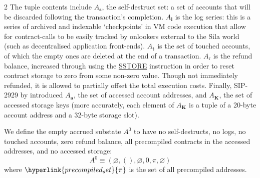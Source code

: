 \documentclass[9pt,oneside]{amsart}
\begin{document}
\begin{multicols}{2}
\hypertarget{self_destruct_set_wordy_defn_A__s}{}The tuple contents include $A_{\mathbf{s}}$, the self-destruct set: a set of accounts that will be discarded following the transaction's completion.
\hypertarget{tx_log_series_wordy_defn_A__l}{} $A_{\mathbf{l}}$ is the log series: this is a series of archived and indexable `checkpoints' in VM code execution that allow for contract-calls to be easily tracked by onlookers external to the Sila world (such as decentralised application front-ends).
\hypertarget{tx_touched_accounts_wordy_defn_A__t}{} $A_{\mathbf{t}}$ is the set of touched accounts, of which the empty ones are deleted at the end of a transaction.
\hypertarget{refund_balance_defn_words_A__r}{}$A_{\mathrm{r}}$ is the refund balance, increased through using the \hyperlink{SSTORE}{{\small SSTORE}} instruction in order to reset contract storage to zero from some non-zero value. Though not immediately refunded, it is allowed to partially offset the total execution costs.
Finally, SIP-2929 by \cite{SIP-2929} introduced \hypertarget{accessed_addresses_defn_words_A__a}{}$A_{\mathbf{a}}$, the set of accessed account addresses, and \hypertarget{accessed_storage_keys_defn_words_A__k}{}$A_{\mathbf{K}}$, the set of accessed storage keys
(more accurately, each element of $A_{\mathbf{K}}$ is a tuple of a 20-byte account address and a 32-byte storage slot).

We define the empty accrued substate $A^0$ to have no self-destructs, no logs, no touched accounts, zero refund balance, all precompiled contracts in the accessed addresses, and no accessed storage:
\begin{equation}
A^0 \equiv (\varnothing, (), \varnothing, 0, \pi, \varnothing)
\end{equation}
where $\hyperlink{precompiled_set}{\pi}$ is the set of all precompiled addresses.


\end{multicols}
\end{document}
